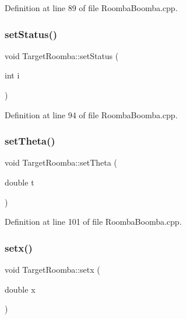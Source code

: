 Definition at line 89 of file Roomba\+Boomba.\+cpp.

\mbox{\label{classTargetRoomba_aa05198f7082b1480d7561dad8ce73f08}} 
\subsubsection{\texorpdfstring{setStatus()}{setStatus()}}
{\footnotesize\ttfamily void Target\+Roomba\+::set\+Status (\begin{DoxyParamCaption}\item[{int}]{i }\end{DoxyParamCaption})\hspace{0.3cm}{\ttfamily [inline]}}



Definition at line 94 of file Roomba\+Boomba.\+cpp.

\mbox{\label{classTargetRoomba_abe60f39d875da4194b6cc3dec1653751}} 
\subsubsection{\texorpdfstring{setTheta()}{setTheta()}}
{\footnotesize\ttfamily void Target\+Roomba\+::set\+Theta (\begin{DoxyParamCaption}\item[{double}]{t }\end{DoxyParamCaption})\hspace{0.3cm}{\ttfamily [inline]}}



Definition at line 101 of file Roomba\+Boomba.\+cpp.

\mbox{\label{classTargetRoomba_adbe68bf4d207778d0a75520b3a9615ef}} 
\subsubsection{\texorpdfstring{setx()}{setx()}}
{\footnotesize\ttfamily void Target\+Roomba\+::setx (\begin{DoxyParamCaption}\item[{double}]{x }\end{DoxyParamCaption})\hspace{0.3cm}{\ttfamily [inline]}}



